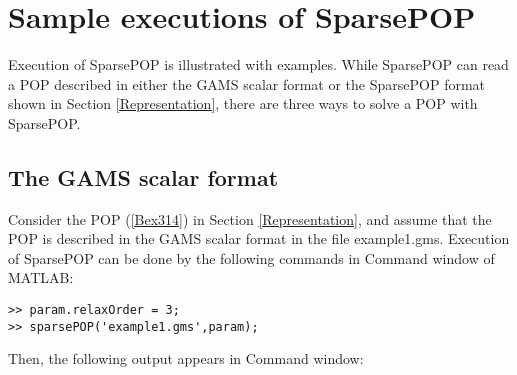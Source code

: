 \section{Sample executions of SparsePOP}
\label{sample}

Execution of  SparsePOP is illustrated with  examples.  
While SparsePOP can read a POP described in either the GAMS scalar format or 
the SparsePOP format shown in Section \ref{Representation},  there are three ways to
solve a POP  with SparsePOP. 

\subsection{The GAMS scalar format}

Consider the POP 
(\ref{Bex314})  in Section \ref{Representation}, and assume that the POP is described in 
the GAMS scalar format in the file example1.gms. %
Execution of SparsePOP
can be done by the following commands in Command window of MATLAB:
\begin{verbatim}
>> param.relaxOrder = 3;
>> sparsePOP('example1.gms',param);
\end{verbatim}
Then,  the following output appears in Command window: 
